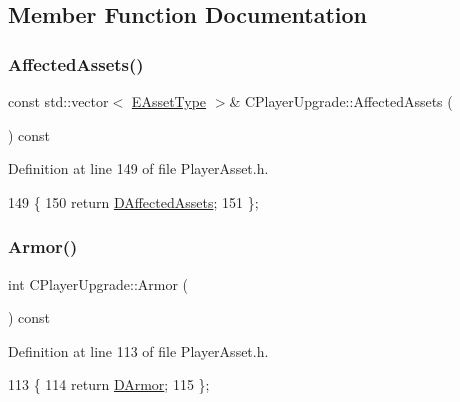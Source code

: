 \subsection{Member Function Documentation}
\hypertarget{classCPlayerUpgrade_a5e9516439965028c758a7383c2957a6c}{}\label{classCPlayerUpgrade_a5e9516439965028c758a7383c2957a6c} 
\subsubsection{\texorpdfstring{Affected\+Assets()}{AffectedAssets()}}
{\footnotesize\ttfamily const std\+::vector$<$ \hyperlink{GameDataTypes_8h_a5600d4fc433b83300308921974477fec}{E\+Asset\+Type} $>$\& C\+Player\+Upgrade\+::\+Affected\+Assets (\begin{DoxyParamCaption}{ }\end{DoxyParamCaption}) const\hspace{0.3cm}{\ttfamily [inline]}}



Definition at line 149 of file Player\+Asset.\+h.


\begin{DoxyCode}
149                                                              \{
150             \textcolor{keywordflow}{return} \hyperlink{classCPlayerUpgrade_adf7bd5e0d37611eb17cccd4ffa789ae6}{DAffectedAssets};  
151         \};
\end{DoxyCode}
\hypertarget{classCPlayerUpgrade_a7717f1de7fc982320845b590def4846e}{}\label{classCPlayerUpgrade_a7717f1de7fc982320845b590def4846e} 
\subsubsection{\texorpdfstring{Armor()}{Armor()}}
{\footnotesize\ttfamily int C\+Player\+Upgrade\+::\+Armor (\begin{DoxyParamCaption}{ }\end{DoxyParamCaption}) const\hspace{0.3cm}{\ttfamily [inline]}}



Definition at line 113 of file Player\+Asset.\+h.


\begin{DoxyCode}
113                          \{
114             \textcolor{keywordflow}{return} \hyperlink{classCPlayerUpgrade_af6ec93ed116043353690363f46957eef}{DArmor};  
115         \};
\end{DoxyCode}
\hypertarget{classCPlayerUpgrade_a64268c0dbb2f87cb2e830d361c2f9233}{}\label{classCPlayerUpgrade_a64268c0dbb2f87cb2e830d361c2f9233} 
